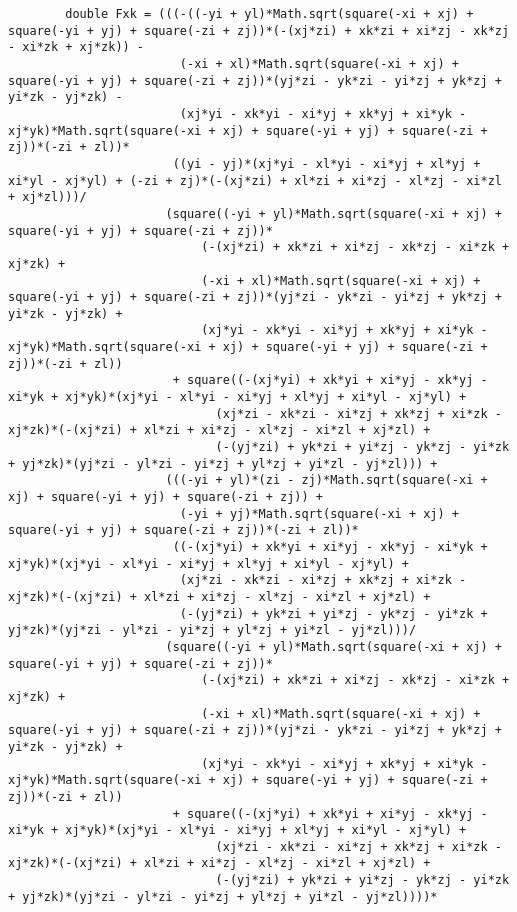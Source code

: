 \begin{lstlisting}
		double Fxk = (((-((-yi + yl)*Math.sqrt(square(-xi + xj) + square(-yi + yj) + square(-zi + zj))*(-(xj*zi) + xk*zi + xi*zj - xk*zj - xi*zk + xj*zk)) - 
						(-xi + xl)*Math.sqrt(square(-xi + xj) + square(-yi + yj) + square(-zi + zj))*(yj*zi - yk*zi - yi*zj + yk*zj + yi*zk - yj*zk) - 
						(xj*yi - xk*yi - xi*yj + xk*yj + xi*yk - xj*yk)*Math.sqrt(square(-xi + xj) + square(-yi + yj) + square(-zi + zj))*(-zi + zl))*
					   ((yi - yj)*(xj*yi - xl*yi - xi*yj + xl*yj + xi*yl - xj*yl) + (-zi + zj)*(-(xj*zi) + xl*zi + xi*zj - xl*zj - xi*zl + xj*zl)))/
					  (square((-yi + yl)*Math.sqrt(square(-xi + xj) + square(-yi + yj) + square(-zi + zj))*
						   (-(xj*zi) + xk*zi + xi*zj - xk*zj - xi*zk + xj*zk) + 
						   (-xi + xl)*Math.sqrt(square(-xi + xj) + square(-yi + yj) + square(-zi + zj))*(yj*zi - yk*zi - yi*zj + yk*zj + yi*zk - yj*zk) + 
						   (xj*yi - xk*yi - xi*yj + xk*yj + xi*yk - xj*yk)*Math.sqrt(square(-xi + xj) + square(-yi + yj) + square(-zi + zj))*(-zi + zl))
					   + square((-(xj*yi) + xk*yi + xi*yj - xk*yj - xi*yk + xj*yk)*(xj*yi - xl*yi - xi*yj + xl*yj + xi*yl - xj*yl) + 
							 (xj*zi - xk*zi - xi*zj + xk*zj + xi*zk - xj*zk)*(-(xj*zi) + xl*zi + xi*zj - xl*zj - xi*zl + xj*zl) + 
							 (-(yj*zi) + yk*zi + yi*zj - yk*zj - yi*zk + yj*zk)*(yj*zi - yl*zi - yi*zj + yl*zj + yi*zl - yj*zl))) + 
					  (((-yi + yl)*(zi - zj)*Math.sqrt(square(-xi + xj) + square(-yi + yj) + square(-zi + zj)) + 
						(-yi + yj)*Math.sqrt(square(-xi + xj) + square(-yi + yj) + square(-zi + zj))*(-zi + zl))*
					   ((-(xj*yi) + xk*yi + xi*yj - xk*yj - xi*yk + xj*yk)*(xj*yi - xl*yi - xi*yj + xl*yj + xi*yl - xj*yl) + 
						(xj*zi - xk*zi - xi*zj + xk*zj + xi*zk - xj*zk)*(-(xj*zi) + xl*zi + xi*zj - xl*zj - xi*zl + xj*zl) + 
						(-(yj*zi) + yk*zi + yi*zj - yk*zj - yi*zk + yj*zk)*(yj*zi - yl*zi - yi*zj + yl*zj + yi*zl - yj*zl)))/
					  (square((-yi + yl)*Math.sqrt(square(-xi + xj) + square(-yi + yj) + square(-zi + zj))*
						   (-(xj*zi) + xk*zi + xi*zj - xk*zj - xi*zk + xj*zk) + 
						   (-xi + xl)*Math.sqrt(square(-xi + xj) + square(-yi + yj) + square(-zi + zj))*(yj*zi - yk*zi - yi*zj + yk*zj + yi*zk - yj*zk) + 
						   (xj*yi - xk*yi - xi*yj + xk*yj + xi*yk - xj*yk)*Math.sqrt(square(-xi + xj) + square(-yi + yj) + square(-zi + zj))*(-zi + zl))
					   + square((-(xj*yi) + xk*yi + xi*yj - xk*yj - xi*yk + xj*yk)*(xj*yi - xl*yi - xi*yj + xl*yj + xi*yl - xj*yl) + 
							 (xj*zi - xk*zi - xi*zj + xk*zj + xi*zk - xj*zk)*(-(xj*zi) + xl*zi + xi*zj - xl*zj - xi*zl + xj*zl) + 
							 (-(yj*zi) + yk*zi + yi*zj - yk*zj - yi*zk + yj*zk)*(yj*zi - yl*zi - yi*zj + yl*zj + yi*zl - yj*zl))))*

\end{lstlisting}
